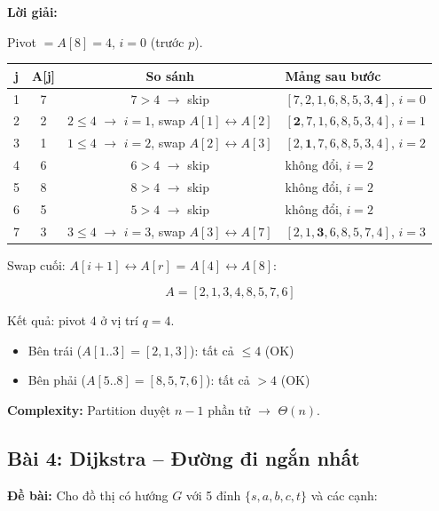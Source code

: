 \documentclass[10pt]{article}
\providecommand{\tightlist}{\setlength{\itemsep}{0pt}\setlength{\parskip}{0pt}}
\begin{document}
\textbf{Lời giải:}

Pivot $= A[8] = 4$, $i = 0$ (trước $p$).

\begin{center}
\begin{tabular}{|c|c|c|l|}
\hline
\textbf{j} & \textbf{A[j]} & \textbf{So sánh} & \textbf{Mảng sau bước} \\
\hline
1 & 7 & $7 > 4$ $\to$ skip & $[7, 2, 1, 6, 8, 5, 3, \mathbf{4}]$, $i=0$ \\
\hline
2 & 2 & $2 \leq 4$ $\to$ $i{=}1$, swap $A[1] \leftrightarrow A[2]$ & $[\mathbf{2}, 7, 1, 6, 8, 5, 3, 4]$, $i=1$ \\
\hline
3 & 1 & $1 \leq 4$ $\to$ $i{=}2$, swap $A[2] \leftrightarrow A[3]$ & $[2, \mathbf{1}, 7, 6, 8, 5, 3, 4]$, $i=2$ \\
\hline
4 & 6 & $6 > 4$ $\to$ skip & không đổi, $i=2$ \\
\hline
5 & 8 & $8 > 4$ $\to$ skip & không đổi, $i=2$ \\
\hline
6 & 5 & $5 > 4$ $\to$ skip & không đổi, $i=2$ \\
\hline
7 & 3 & $3 \leq 4$ $\to$ $i{=}3$, swap $A[3] \leftrightarrow A[7]$ & $[2, 1, \mathbf{3}, 6, 8, 5, 7, 4]$, $i=3$ \\
\hline
\end{tabular}
\end{center}

Swap cuối: $A[i+1] \leftrightarrow A[r]$ = $A[4] \leftrightarrow A[8]$:

$$A = [2, 1, 3, \boxed{4}, 8, 5, 7, 6]$$

Kết quả: pivot $4$ ở vị trí $q = 4$.
\begin{itemize}
\tightlist
\item Bên trái ($A[1..3] = [2, 1, 3]$): tất cả $\leq 4$ (OK)
\item Bên phải ($A[5..8] = [8, 5, 7, 6]$): tất cả $> 4$ (OK)
\end{itemize}

\textbf{Complexity:} Partition duyệt $n-1$ phần tử $\to$ $\Theta(n)$.


\subsection{Bài 4: Dijkstra -- Đường đi ngắn nhất}

\textbf{Đề bài:} Cho đồ thị có hướng $G$ với 5 đỉnh $\{s, a, b, c, t\}$ và các cạnh:
\end{document}
